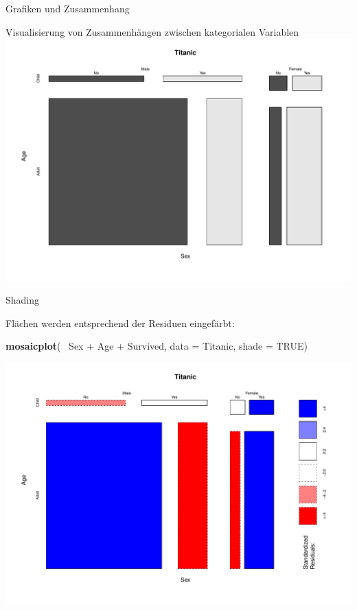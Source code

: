 \documentclass[ignorenonframetext,]{beamer}
\newenvironment{Shaded}{}{}
\newcommand{\KeywordTok}[1]{\textcolor[rgb]{0.00,0.44,0.13}{\textbf{{#1}}}}
\newcommand{\DataTypeTok}[1]{\textcolor[rgb]{0.56,0.13,0.00}{{#1}}}
\newcommand{\StringTok}[1]{\textcolor[rgb]{0.25,0.44,0.63}{{#1}}}
\newcommand{\OtherTok}[1]{\textcolor[rgb]{0.00,0.44,0.13}{{#1}}}
\newcommand{\NormalTok}[1]{{#1}}
\begin{document}
\begin{frame}[fragile]{Grafiken und Zusammenhang}
\begin{block}{Visualisierung von Zusammenhängen zwischen kategorialen
Variablen}
\includegraphics{R_intern_files/figure-beamer/unnamed-chunk-215-1.pdf}

\end{block}

\begin{block}{Shading}

Flächen werden entsprechend der Residuen eingefärbt:

\begin{Shaded}
\begin{Highlighting}[]
\KeywordTok{mosaicplot}\NormalTok{(~}\StringTok{ }\NormalTok{Sex +}\StringTok{ }\NormalTok{Age +}\StringTok{ }\NormalTok{Survived, }
           \DataTypeTok{data =} \NormalTok{Titanic, }\DataTypeTok{shade =} \OtherTok{TRUE}\NormalTok{)}
\end{Highlighting}
\end{Shaded}

\includegraphics{R_intern_files/figure-beamer/unnamed-chunk-216-1.pdf}


\end{block}
\end{frame}
\end{document}
